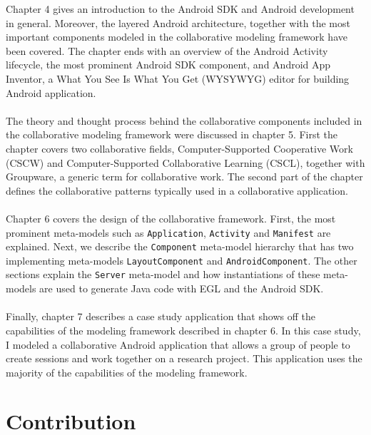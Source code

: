 Chapter 4 gives an introduction to the Android SDK and Android development in general. Moreover, the layered Android architecture, together with the most important components modeled in the collaborative modeling framework have been covered. The chapter ends with an overview of the Android Activity lifecycle, the most prominent Android SDK component, and Android App Inventor, a What You See Is What You Get (WYSYWYG) editor for building Android application. \\ \\
The theory and thought process behind the collaborative components included in the collaborative modeling framework were discussed in chapter 5. First the chapter covers two collaborative fields, Computer-Supported Cooperative Work (CSCW) and Computer-Supported Collaborative Learning (CSCL), together with Groupware, a generic term for collaborative work. The second part of the chapter defines the collaborative patterns typically used in a collaborative application.  \\ \\
Chapter 6 covers the design of the collaborative framework. First, the most prominent meta-models such as \texttt{Application}, \texttt{Activity} and \texttt{Manifest} are explained. Next, we describe the \texttt{Component} meta-model hierarchy that has two implementing meta-models \texttt{LayoutComponent} and \texttt{AndroidComponent}. The other sections explain the \texttt{Server} meta-model and how instantiations of these meta-models are used to generate Java code with EGL and the Android SDK. \\ \\
Finally, chapter 7 describes a case study application that shows off the capabilities of the modeling framework described in chapter 6. In this case study, I modeled a collaborative Android application that allows a group of people to create sessions and work together on a research project. This application uses the majority of the capabilities of the modeling framework.

\section{Contribution}

